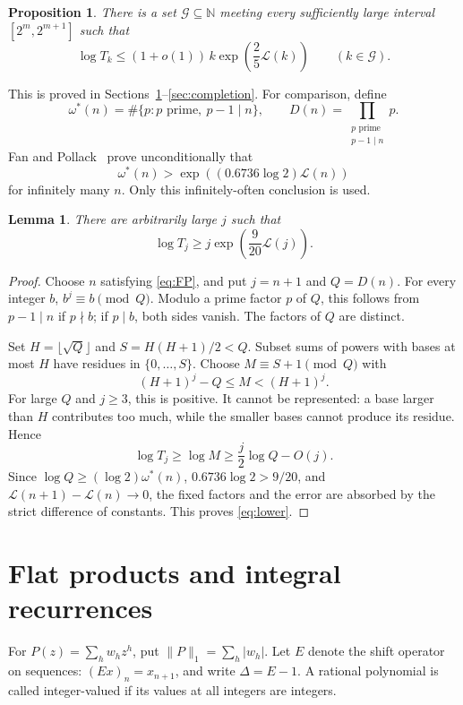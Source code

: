 \documentclass[11pt]{amsart}
\numberwithin{equation}{section}
\newtheorem{proposition}[theorem]{Proposition}
\newtheorem{lemma}[theorem]{Lemma}
\theoremstyle{remark}
\newcommand{\N}{\mathbb N}
\newcommand{\normone}[1]{\lVert #1\rVert_1}
\begin{document}
\begin{proposition}\label{prop:upper}
There is a set \(\mathcal G\subseteq\N\) meeting every sufficiently large
interval \([2^m,2^{m+1}]\) such that
\begin{equation}\label{eq:upper}
 \log T_k\le(1+o(1))\,k\exp\!\left(\frac25\mathcal L(k)\right)
 \qquad(k\in\mathcal G).
\end{equation}
\end{proposition}
This is proved in Sections~\ref{sec:flat}--\ref{sec:completion}.
For comparison, define
\[
 \omega^*(n)=\#\{p:p\text{ prime},\ p-1\mid n\},\qquad
 D(n)=\prod_{\substack{p\text{ prime}\\p-1\mid n}}p.
\]
Fan and Pollack~\cite[Theorem~1]{FP} prove unconditionally that
\begin{equation}\label{eq:FP}
 \omega^*(n)>
 \exp\!\left((0.6736\log2)\mathcal L(n)\right)
\end{equation}
for infinitely many \(n\). Only this infinitely-often conclusion is used.

\begin{lemma}\label{lem:lower}
There are arbitrarily large \(j\) such that
\begin{equation}\label{eq:lower}
 \log T_j\ge j\exp\!\left(\frac9{20}\mathcal L(j)\right).
\end{equation}
\end{lemma}
\begin{proof}
Choose \(n\) satisfying \eqref{eq:FP}, and put \(j=n+1\) and \(Q=D(n)\).
For every integer \(b\), \(b^j\equiv b\pmod Q\). Modulo a prime factor
\(p\) of \(Q\), this follows from \(p-1\mid n\) if \(p\nmid b\);
if \(p\mid b\), both sides vanish. The factors of \(Q\) are distinct.

Set \(H=\lfloor\sqrt Q\rfloor\) and \(S=H(H+1)/2<Q\).
Subset sums of powers with bases at most \(H\) have residues in
\(\{0,\ldots,S\}\). Choose \(M\equiv S+1\pmod Q\) with
\[
 (H+1)^j-Q\le M<(H+1)^j.
\]
For large \(Q\) and \(j\ge3\), this is positive. It cannot be represented:
a base larger than \(H\) contributes too much, while the smaller bases
cannot produce its residue. Hence
\[
 \log T_j\ge\log M\ge \frac j2\log Q-O(j).
\]
Since \(\log Q\ge(\log2)\omega^*(n)\),
\(0.6736\log2>9/20\), and
\(\mathcal L(n+1)-\mathcal L(n)\to0\), the fixed factors and the error
are absorbed by the strict difference of constants. This proves
\eqref{eq:lower}.
\end{proof}

\section{Flat products and integral recurrences}\label{sec:flat}
For \(P(z)=\sum_h w_hz^h\), put \(\normone P=\sum_h|w_h|\).
Let \(E\) denote the shift operator on sequences:
\((Ex)_n=x_{n+1}\), and write \(\Delta=E-1\).
A rational polynomial is called integer-valued if its values at all
integers are integers.
\end{document}
